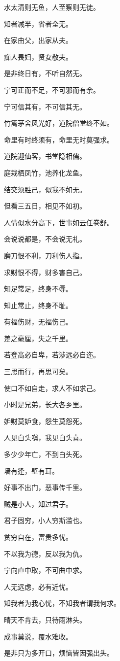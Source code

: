 \documentclass[12pt,oneside]{book}
\begin{document}
水太清则无鱼，人至察则无徒。

知者减半，省者全无。

在家由父，出家从夫。

痴人畏妇，贤女敬夫。

是非终日有，不听自然无。

宁可正而不足，不可邪而有余。

宁可信其有，不可信其无。

竹篱茅舍风光好，道院僧堂终不如。

命里有时终须有，命里无时莫强求。

道院迎仙客，书堂隐相儒。

庭栽栖凤竹，池养化龙鱼。

结交须胜己，似我不如无。

但看三五日，相见不如初。

人情似水分高下，世事如云任卷舒。

会说说都是，不会说无礼。

磨刀恨不利，刀利伤人指。

求财恨不得，财多害自己。

知足常足，终身不辱。

知止常止，终身不耻。

有福伤财，无福伤己。

差之毫厘，失之千里。

若登高必自卑，若涉远必自迩。

三思而行，再思可矣。

使口不如自走，求人不如求己。

小时是兄弟，长大各乡里。

妒财莫妒食，怨生莫怨死。

人见白头嗔，我见白头喜。

多少少年亡，不到白头死。

墙有逢，壁有耳。

好事不出门，恶事传千里。

贼是小人，知过君子。

君子固穷，小人穷斯滥也。

贫穷自在，富贵多忧。

不以我为德，反以我为仇。

宁向直中取，不可曲中求。

人无远虑，必有近忧。

知我者为我心忧，不知我者谓我何求。

晴天不肯去，只待雨淋头。

成事莫说，覆水难收。

是非只为多开口，烦恼皆因强出头。
\end{document}
